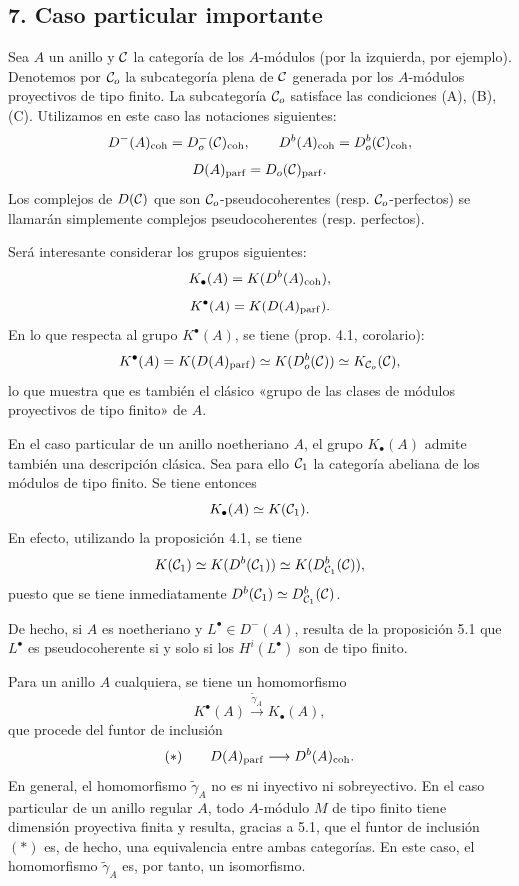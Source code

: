 \subsection*{7. Caso particular importante}

Sea $A$ un anillo y $\mathcal C$ la categoría de los $A$-módulos (por la izquierda, por ejemplo). Denotemos por $\mathcal C_o$ la subcategoría plena de $\mathcal C$ generada por los $A$-módulos proyectivos de tipo finito. La subcategoría $\mathcal C_o$ satisface las condiciones (A), (B), (C). Utilizamos en este caso las notaciones siguientes:
\[
D^-(A)_{\mathrm{coh}}=D_o^-(\mathcal C)_{\mathrm{coh}},\qquad
D^b(A)_{\mathrm{coh}}=D_o^b(\mathcal C)_{\mathrm{coh}},
\]
\[
D(A)_{\mathrm{parf}}=D_o(\mathcal C)_{\mathrm{parf}}.
\]
Los complejos de $D(\mathcal C)$ que son $\mathcal C_o$-pseudocoherentes (resp. $\mathcal C_o$-perfectos) se llamarán simplemente complejos pseudocoherentes (resp. perfectos).

Será interesante considerar los grupos siguientes:
\[
K_\bullet(A)=K(D^b(A)_{\mathrm{coh}}),
\]
\[
K^\bullet(A)=K(D(A)_{\mathrm{parf}}).
\]
En lo que respecta al grupo $K^\bullet(A)$, se tiene (prop. 4.1, corolario):
\[
K^\bullet(A)=K(D(A)_{\mathrm{parf}})\simeq K(D_o^b(\mathcal C))\simeq K_{\mathcal C_o}(\mathcal C),
\]
lo que muestra que es también el clásico «grupo de las clases de módulos proyectivos de tipo finito» de $A$.

En el caso particular de un anillo noetheriano $A$, el grupo $K_\bullet(A)$ admite también una descripción clásica. Sea para ello $\mathcal C_1$ la categoría abeliana de los módulos de tipo finito. Se tiene entonces
\[
K_\bullet(A)\simeq K(\mathcal C_1).
\]
En efecto, utilizando la proposición 4.1, se tiene
\[
K(\mathcal C_1)\simeq K(D^b(\mathcal C_1))\simeq K(D^b_{\mathcal C_1}(\mathcal C)),
\]
puesto que se tiene inmediatamente $D^b(\mathcal C_1)\simeq D^b_{\mathcal C_1}(\mathcal C)$.

De hecho, si $A$ es noetheriano y $L^\bullet\in D^-(A)$, resulta de la proposición 5.1 que $L^\bullet$ es pseudocoherente si y solo si los $H^i(L^\bullet)$ son de tipo finito.

Para un anillo $A$ cualquiera, se tiene un homomorfismo
\[
K^{\bullet}(A)\xrightarrow{\widetilde\gamma_A}K_\bullet(A),
\]
que procede del funtor de inclusión
\[
(*)\qquad D(A)_{\mathrm{parf}}\longrightarrow D^b(A)_{\mathrm{coh}}.
\]
En general, el homomorfismo $\widetilde\gamma_A$ no es ni inyectivo ni sobreyectivo. En el caso particular de un anillo regular $A$, todo $A$-módulo $M$ de tipo finito tiene dimensión proyectiva finita y resulta, gracias a 5.1, que el funtor de inclusión $(*)$ es, de hecho, una equivalencia entre ambas categorías. En este caso, el homomorfismo $\widetilde\gamma_A$ es, por tanto, un isomorfismo.
